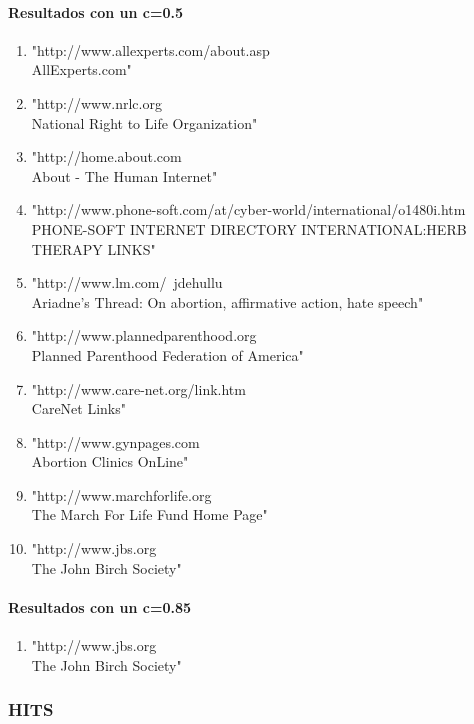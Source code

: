 \paragraph{Resultados con un c=0.5}
 \begin{enumerate}
 \item "http://www.allexperts.com/about.asp\\
AllExperts.com"
 \item"http://www.nrlc.org\\
National Right to Life Organization"
 \item"http://home.about.com\\
About - The Human Internet"
 \item"http://www.phone-soft.com/at/cyber-world/international/o1480i.htm\\
PHONE-SOFT INTERNET DIRECTORY INTERNATIONAL:HERB THERAPY LINKS"
 \item"http://www.lm.com/~jdehullu\\
Ariadne's Thread: On abortion, affirmative action, hate speech"
 \item"http://www.plannedparenthood.org\\
Planned Parenthood Federation of America"
 \item"http://www.care-net.org/link.htm\\
CareNet Links"
 \item"http://www.gynpages.com\\
Abortion Clinics OnLine"
 \item"http://www.marchforlife.org\\
The March For Life Fund Home Page"
 \item"http://www.jbs.org\\
The John Birch Society"
 \end{enumerate}
 
\paragraph{Resultados con un c=0.85}
 \begin{enumerate}

 \item"http://www.jbs.org\\
The John Birch Society"\\
 \end{enumerate}
 
\subsubsection{HITS}
